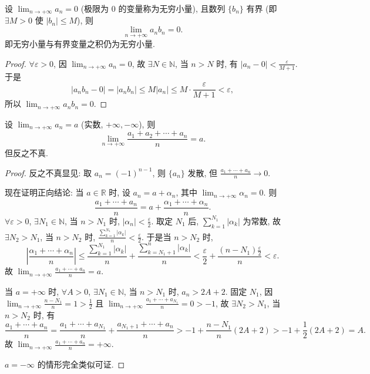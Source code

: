 \begin{example}\label{ex:1.1.14}
设 $\lim_{n\to+\infty}a_n=0$ (极限为 0 的变量称为无穷小量), 且数列 $\{b_n\}$ 有界 (即 $\exists M>0$ 使 $|b_n|\leqslant M$), 则
\[
  \lim_{n\to+\infty}a_n b_n = 0.
\]
即无穷小量与有界变量之积仍为无穷小量.
\end{example}
\begin{proof}
$\forall\varepsilon>0$, 因 $\lim_{n\to+\infty}a_n=0$, 故 $\exists N\in\mathbb{N}$, 当 $n>N$ 时, 有 $|a_n-0|<\frac{\varepsilon}{M+1}$. 于是
\[
  |a_{n}b_{n}-0|=|a_{n}b_{n}|\leqslant M|a_{n}| \leqslant M\cdot\frac{\varepsilon}{M+1}<\varepsilon,
\]
所以 $\lim_{n\to+\infty}a_n b_n = 0$.
\end{proof}

\begin{example}\label{ex:1.1.15}
设 $\lim_{n\to+\infty}a_n=a$ (实数, $+\infty, -\infty$), 则
\[
  \lim_{n\to+\infty}\frac{a_1+a_2+\cdots+a_n}{n}=a.
\]
但反之不真.
\end{example}
\begin{proof}
反之不真显见: 取 $a_n=(-1)^{n-1}$, 则 $\{a_n\}$ 发散, 但 $\frac{a_1+\cdots+a_n}{n}\to 0$.

现在证明正向结论:
当 $a\in\mathbb{R}$ 时, 设 $a_n = a+\alpha_n$, 其中 $\lim_{n\to+\infty}\alpha_n=0$. 则
\[
  \frac{a_1+\cdots+a_n}{n} = a + \frac{\alpha_1+\cdots+\alpha_n}{n}.
\]
$\forall\varepsilon>0$, $\exists N_1\in\mathbb{N}$, 当 $n>N_1$ 时, $|\alpha_n|<\frac{\varepsilon}{2}$. 取定 $N_1$ 后, $\sum_{k=1}^{N_1}|\alpha_k|$ 为常数, 故 $\exists N_2>N_1$, 当 $n>N_2$ 时, $\frac{\sum_{k=1}^{N_1}|\alpha_k|}{n}<\frac{\varepsilon}{2}$. 于是当 $n>N_2$ 时,
\[
  \left|\frac{\alpha_1+\cdots+\alpha_n}{n}\right| \leqslant \frac{\sum_{k=1}^{N_1}|\alpha_k|}{n} + \frac{\sum_{k=N_1+1}^n|\alpha_k|}{n} < \frac{\varepsilon}{2} + \frac{(n-N_1)\frac{\varepsilon}{2}}{n} < \varepsilon.
\]
故 $\lim_{n\to+\infty}\frac{a_1+\cdots+a_n}{n}=a$.

当 $a=+\infty$ 时, $\forall A>0$, $\exists N_1\in\mathbb{N}$, 当 $n>N_1$ 时, $a_n > 2A+2$. 固定 $N_1$, 因 $\lim_{n\to+\infty}\frac{n-N_1}{n}=1>\frac{1}{2}$ 且 $\lim_{n\to+\infty}\frac{a_1+\cdots+a_{N_1}}{n}=0>-1$, 故 $\exists N_2>N_1$, 当 $n>N_2$ 时, 有
\[
  \frac{a_1+\cdots+a_n}{n} = \frac{a_1+\cdots+a_{N_1}}{n} + \frac{a_{N_1+1}+\cdots+a_n}{n} > -1 + \frac{n-N_1}{n}(2A+2) > -1 + \frac{1}{2}(2A+2) = A.
\]
故 $\lim_{n\to+\infty}\frac{a_1+\cdots+a_n}{n}=+\infty$.

$a=-\infty$ 的情形完全类似可证.
\end{proof}


